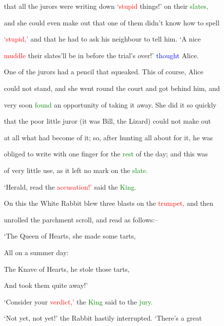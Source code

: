  that all the jurors were writing down \textcolor{red}{‘stupid} things!’ on their \textcolor{green}{slates,}

 and she could even make out that one of them didn’t know how to spell

 \textcolor{red}{‘stupid,’} and that he had to ask his neighbour to tell him. ‘A nice

 \textcolor{red}{muddle} their slates’ll be in before the trial’s over!’ \textcolor{blue}{thought} Alice.



 One of the jurors had a pencil that squeaked. This of course, Alice

 could not stand, and she went round the \textcolor{BurntOrange}{court} and got behind him, and

 very soon \textcolor{green}{found} an \textcolor{BurntOrange}{opportunity} of taking it away. She did it so quickly

 that the poor little juror (it was Bill, the Lizard) could not make out

 at all what had become of it; so, after hunting all about for it, he was

 \textcolor{BurntOrange}{obliged} to write with one finger for the \textcolor{green}{rest} of the day; and this was

 of very little use, as it left no mark on the \textcolor{green}{slate.}



 ‘Herald, read the \textcolor{red}{accusation!’} said the \textcolor{green}{King.}



 On this the \textcolor{BurntOrange}{White} Rabbit blew three \textcolor{BurntOrange}{blasts} on the \textcolor{red}{trumpet,} and then

 unrolled the parchment scroll, and read as follows:--



 ‘The Queen of Hearts, she made some tarts,

 All on a summer day:

 The Knave of Hearts, he stole those tarts,

 And took them quite away!’



 ‘Consider your \textcolor{red}{verdict,’} the \textcolor{green}{King} said to the \textcolor{green}{jury.}



 ‘Not yet, not yet!’ the Rabbit hastily \textcolor{BurntOrange}{interrupted.} ‘There’s a great

